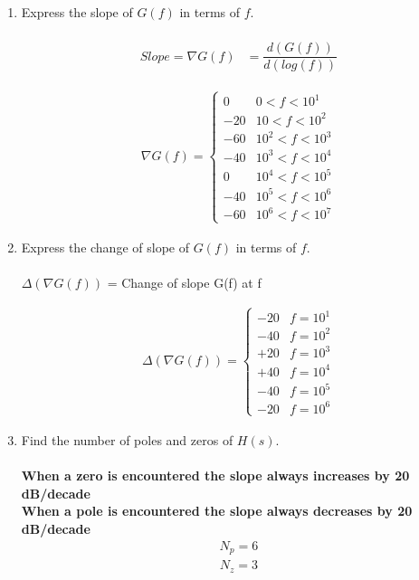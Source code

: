 \begin{enumerate}[label=\thesection.\arabic*.,ref=\thesection.\theenumi]
\item Express the slope of $G(f)$ in terms of $f$.
\\
\solution\\
\begin{align}
Slope = \nabla G(f) &= \dfrac{d(G(f))}{d(log(f))}
\end{align}

\begin{align}
 \nabla G(f) = 
 \begin{cases} 
        0 & 0 < f < 10^{1} \\
      -20 & 10 < f < 10^{2} \\
      -60 & 10^{2} < f < 10^{3} \\
      -40 & 10^{3} < f < 10^{4} \\
       0 & 10^{4} < f < 10^{5} \\
      -40 & 10^{5} < f < 10^{6} \\
      -60 & 10^{6} < f < 10^{7}   
 \end{cases}
\end{align}


\item Express the change of slope of $G(f)$ in terms of $f$.
\\
\solution\\
$\Delta(\nabla G(f))$  = Change of slope G(f) at f

\begin{align}
 \Delta(\nabla G(f)) = 
 \begin{cases} 
      -20 &  f = 10^{1} \\
      -40 &  f = 10^{2} \\
      +20 &  f = 10^{3} \\
      +40 &  f = 10^{4} \\
      -40 &  f = 10^{5} \\
      -20 &  f = 10^{6} 
 \end{cases}
\end{align}


\item Find the number of poles and zeros of $H(s)$.
\\
\solution \\
\textbf{When a zero is encountered the slope always increases by 20 dB/decade}\\
\textbf{When a pole is encountered the slope always decreases by 20 dB/decade}
\begin{align}
	N_{p} = 6  
\end{align}
\begin{align}
	N_{z} = 3
\end{align}


\end{enumerate}
